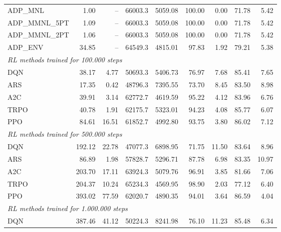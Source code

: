 \begin{samepage}
\begin{center}
\begin{tabular}{l|rr|rr|rr|rr}
    \midrule
    ADP\_MNL     &     1.00 &    -- &    66003.3 &    5059.08 &  100.00 &    0.00 &   71.78 &    5.42 \\
    ADP\_MMNL\_5PT &     1.09 &    -- &    66003.3 &    5059.08 &  100.00 &    0.00 &   71.78 &    5.42 \\
    ADP\_MMNL\_2PT &     1.06 &    -- &    66003.3 &    5059.08 &  100.00 &    0.00 &   71.78 &    5.42 \\
    ADP\_ENV     &    34.85 &    -- &    64549.3 &    4815.01 &   97.83 &    1.92 &   79.21 &    5.38 \\
    \midrule
    \multicolumn{9}{l}{\textit{RL methods trained for 100.000 steps}} \\
    \midrule
    DQN          &    38.17 &     4.77 &    50693.3 &    5406.73 &   76.97 &    7.68 &   85.41 &    7.65 \\
    ARS          &    17.35 &     0.42 &    48796.3 &    7395.55 &   73.70 &    8.45 &   83.50 &    8.98 \\
    A2C          &    39.91 &     3.14 &    62772.7 &    4619.59 &   95.22 &    4.12 &   83.96 &    6.76 \\
    TRPO         &    40.78 &     1.91 &    62175.7 &    5323.01 &   94.23 &    4.08 &   85.77 &    6.07 \\
    PPO          &    84.61 &    16.51 &    61852.7 &    4992.80 &   93.75 &    3.80 &   86.02 &    7.12 \\
    \midrule
    \multicolumn{9}{l}{\textit{RL methods trained for 500.000 steps}} \\
    \midrule
    DQN          &   192.12 &    22.78 &    47077.3 &    6898.95 &   71.75 &   11.50 &   83.64 &    8.96 \\
    ARS          &    86.89 &     1.98 &    57828.7 &    5296.71 &   87.78 &    6.98 &   83.35 &   10.97 \\
    A2C          &   203.70 &    17.11 &    63924.3 &    5079.76 &   96.91 &    3.85 &   81.66 &    7.06 \\
    TRPO         &   204.37 &    10.24 &    65234.3 &    4569.95 &   98.90 &    2.03 &   77.12 &    6.40 \\
    PPO          &   393.02 &    77.59 &    62020.7 &    4890.35 &   94.01 &    3.64 &   86.59 &    4.04 \\
    \midrule
    \multicolumn{9}{l}{\textit{RL methods trained for 1.000.000 steps}} \\
    \midrule
    DQN          &   387.46 &    41.12 &    50224.3 &    8241.98 &   76.10 &   11.23 &   85.48 &    6.34 \\

\end{tabular}
\end{center}
\end{samepage}
